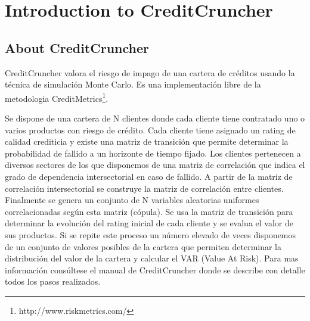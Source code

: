 
%
%
%
%
%
%
%
%

\chapter{Introduction to CreditCruncher}
\label{sec:introduction}

\section{About CreditCruncher}

CreditCruncher valora el riesgo de impago de una cartera de cr\'editos usando la 
t\'ecnica de simulaci\'on Monte Carlo. Es una implementaci\'on libre de la metodologia
CreditMetrics\footnote{http://www.riskmetrics.com/}. 

Se dispone de una cartera de N clientes donde cada cliente tiene contratado uno o 
varios productos con riesgo de crédito. Cada cliente tiene asignado un rating de 
calidad crediticia y existe una matriz de transición que permite determinar la 
probabilidad de fallido a un horizonte de tiempo fijado. Los clientes pertenecen 
a diversos sectores de los que disponemos de una matriz de correlación que 
indica el grado de dependencia intersectorial en caso de fallido. A partir de 
la matriz de correlación intersectorial se construye la matriz de correlación 
entre clientes. Finalmente se genera un conjunto de N variables aleatorias 
uniformes correlacionadas según esta matriz (cópula). Se usa la matriz de 
transición para determinar la evolución del rating inicial de cada cliente y se 
evalua el valor de sus productos. Si se repite este proceso un número elevado de 
veces disponemos de un conjunto de valores posibles de la cartera que permiten 
determinar la distribución del valor de la cartera y calcular el VAR (Value At Risk). 
Para mas información consúltese el manual de CreditCruncher donde se describe 
con detalle todos los pasos realizados.


